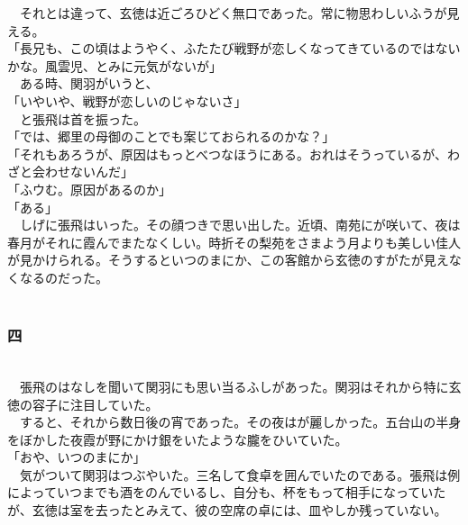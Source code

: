 \documentclass[
  paper=a5,
  fontsize=10pt,
  jafontsize=9.5pt,
  tate,                  %
  open_bracket_pos=nibu, %
]{jlreq}
\begin{document}
　それとは違って、玄徳は近ごろひどく無口であった。常に物思わしいふうが見える。\\


「長兄も、この頃はようやく、ふたたび戦野が恋しくなってきているのではないかな。風雲児、とみに元気がないが」\\


　ある時、関羽がいうと、\\


「いやいや、戦野が恋しいのじゃないさ」\\


　と張飛は首を振った。\\


「では、郷里の母御のことでも案じておられるのかな？」\\


「それもあろうが、原因はもっとべつなほうにある。おれはそうっているが、わざと会わせないんだ」\\


「ふウむ。原因があるのか」\\


「ある」\\


　しげに張飛はいった。その顔つきで思い出した。近頃、南苑にが咲いて、夜は春月がそれに霞んでまたなくしい。時折その梨苑をさまよう月よりも美しい佳人が見かけられる。そうするといつのまにか、この客館から玄徳のすがたが見えなくなるのだった。\\

\\

\subsubsection{四}

\\


　張飛のはなしを聞いて関羽にも思い当るふしがあった。関羽はそれから特に玄徳の容子に注目していた。\\


　すると、それから数日後の宵であった。その夜はが麗しかった。五台山の半身をぼかした夜霞が野にかけ銀をいたような朧をひいていた。\\


「おや、いつのまにか」\\


　気がついて関羽はつぶやいた。三名して食卓を囲んでいたのである。張飛は例によっていつまでも酒をのんでいるし、自分も、杯をもって相手になっていたが、玄徳は室を去ったとみえて、彼の空席の卓には、皿やしか残っていない。\\
\end{document}
